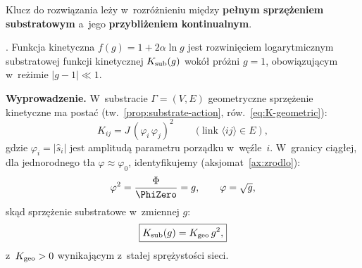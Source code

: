 Klucz do rozwiązania leży w~rozróżnieniu między
\textbf{pełnym sprzężeniem substratowym} a~jego
\textbf{przybliżeniem kontinualnym}.

\begin{proposition}%
\label{prop:f-from-substrate}
.
Funkcja kinetyczna $f(g) = 1 + 2\alpha\ln g$ jest
rozwinięciem logarytmicznym substratowej funkcji
kinetycznej $K_{\rm sub}(g)$ wokół próżni $g = 1$,
obowiązującym w~reżimie $|g - 1| \ll 1$.

\medskip\noindent
\textbf{Wyprowadzenie.}
W~substracie $\Gamma = (V, E)$ geometryczne sprzężenie
kinetyczne ma postać (tw.~\ref{prop:substrate-action},
ró{}w.~\eqref{eq:K-geometric}):
\begin{equation}\label{eq:Kij-substrate}
  K_{ij} = J\,(\varphi_i\,\varphi_j)^2
  \qquad (\text{link } \langle ij \rangle \in E),
\end{equation}
gdzie $\varphi_i = |\hat{s}_i|$ jest amplitudą parametru porządku
w~węźle~$i$. W~granicy ciągłej, dla jednorodnego tła $\varphi \approx
\varphi_0$, identyfikujemy (aksjomat~\ref{ax:zrodlo}):
\begin{equation}\label{eq:phi-to-g}
  \varphi^2 = \frac{\Phi}{\PhiZero} = g,
  \qquad \varphi = \sqrt{g},
\end{equation}
skąd sprzężenie substratowe w~zmiennej $g$:
\begin{equation}\label{eq:Ksub-g}
  \boxed{
    K_{\rm sub}(g) = K_{\rm geo}\,g^2,
  }
\end{equation}
z~$K_{\rm geo} > 0$ wynikającym z~stałej sprężystości sieci.
\end{proposition}

